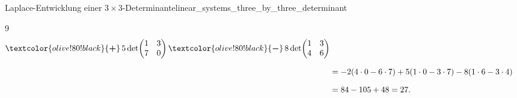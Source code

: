 \begin{ExampleBox}{Laplace-Entwicklung einer $3\times3$-Determinante}{linear_systems_three_by_three_determinant}
\begin{enumerate}[label=\alph*),leftmargin=1.8em,itemsep=0.8em]
\begin{ClozeArea}[32]{9}
\[\begin{aligned}
              \textcolor{olive!80!black}{\boldsymbol{+}}\,5\det\!\begin{pmatrix}1&3\\7&0\end{pmatrix}
              \textcolor{olive!80!black}{\boldsymbol{-}}\,8\det\!\begin{pmatrix}1&3\\4&6\end{pmatrix}\\[0.7em]
            &=-2(4\cdot0-6\cdot7)
              +5(1\cdot0-3\cdot7)
              -8(1\cdot6-3\cdot4)\\[0.7em]
            &=84-105+48=27.
          \end{aligned}
        \]
      \end{ClozeArea}
  \end{enumerate}
\end{ExampleBox}

